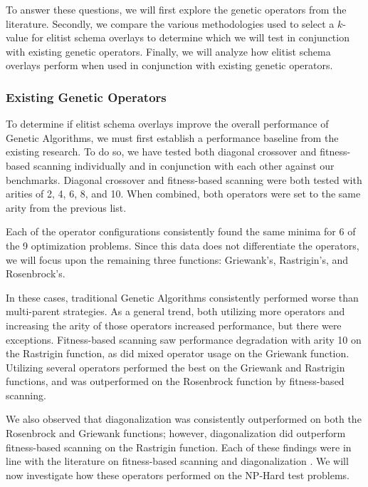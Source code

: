 To answer these questions, we will first explore the genetic operators from the literature. Secondly, we compare the various methodologies used to select a $k$-value for elitist schema overlays to determine which we will test in conjunction with existing genetic operators. Finally, we will analyze how elitist schema overlays perform when used in conjunction with existing genetic operators.

\subsubsection*{Existing Genetic Operators}
To determine if elitist schema overlays improve the overall performance of Genetic Algorithms, we must first establish a performance baseline from the existing research. To do so, we have tested both diagonal crossover and fitness-based scanning individually and in conjunction with each other against our benchmarks. Diagonal crossover and fitness-based scanning were both tested with arities of 2, 4, 6, 8, and 10. When combined, both operators were set to the same arity from the previous list. 

%
%

Each of the operator configurations consistently found the same minima for 6 of the 9 optimization problems. Since this data does not differentiate the operators, we will focus upon the remaining three functions: Griewank's, Rastrigin's, and Rosenbrock's. 

In these cases, traditional Genetic Algorithms consistently performed worse than multi-parent strategies. As a general trend, both utilizing more operators and increasing the arity of those operators increased performance, but there were exceptions. Fitness-based scanning saw performance degradation with arity 10 on the Rastrigin function, as did mixed operator usage on the Griewank function. Utilizing several operators performed the best on the Griewank and Rastrigin functions, and was outperformed on the Rosenbrock function by fitness-based scanning.

We also observed that diagonalization was consistently outperformed on both the Rosenbrock and Griewank functions; however, diagonalization did outperform fitness-based scanning on the Rastrigin function. Each of these findings were in line with the literature on fitness-based scanning and diagonalization \cite{Eiben94, Eiben95}. We will now investigate how these operators performed on the NP-Hard test problems.

